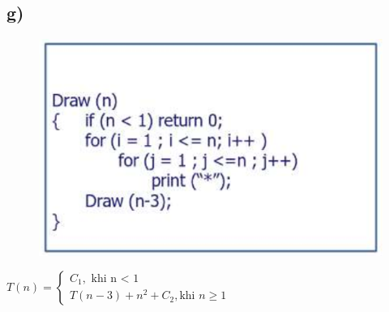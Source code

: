 \documentclass[10pt,a4paper]{article}
\begin{document}
\subsection*{g)}
\begin{figure}[H]
    \centering
    \includegraphics[scale=.7]{images/1g.png}
    \label{fig:my_label}
\end{figure}
$
T(n) = 
    \begin{cases}
        C_1, \text{ khi n < 1} \\
        T(n-3) + n^2 + C_2, \text{khi $n\geq1$}
    \end{cases}
$
\end{document}
